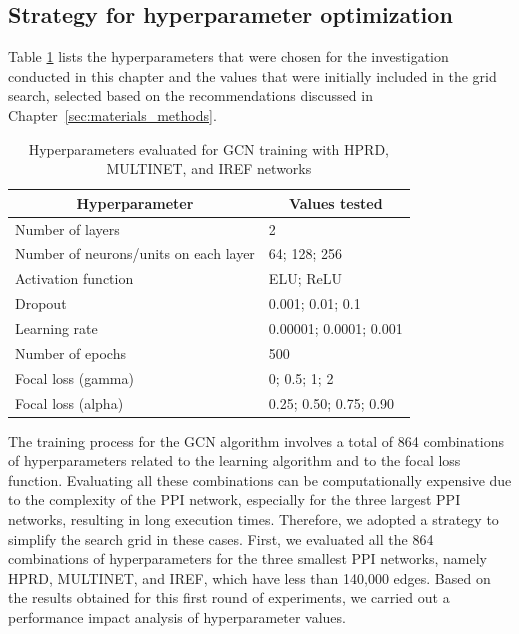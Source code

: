 \subsection{Strategy for hyperparameter optimization}
Table \ref{tab:hyperparameters_range} lists the hyperparameters that were chosen for the investigation conducted in this chapter and the values that were initially included in the grid search, selected based on the recommendations discussed in Chapter~\ref{sec:materials_methods}. 



\begin{table}[!h]
\centering
\caption{Hyperparameters evaluated for GCN training with HPRD, MULTINET, and IREF networks \label{tab:hyperparameters_range}}
\begin{tabular}{ll}
\hline
\multicolumn{1}{c}{Hyperparameter}   & \multicolumn{1}{c}{Values tested} \\ \hline
Number of layers                      & 2                                    \\
Number of neurons/units on each layer & 64; 128; 256                         \\
Activation function                   & ELU; ReLU                            \\
Dropout                               & 0.001; 0.01; 0.1                     \\
Learning rate                         & 0.00001; 0.0001; 0.001               \\
Number of epochs                      & 500                                  \\
Focal loss (gamma)                    & 0; 0.5; 1; 2                         \\
Focal loss (alpha)                    & 0.25; 0.50; 0.75; 0.90               \\ \hline
\end{tabular}
\end{table}

The training process for the GCN algorithm involves a total of 864 combinations of hyperparameters related to the learning algorithm and to the focal loss function. Evaluating all these combinations can be computationally expensive due to the complexity of the PPI network, especially for the three largest PPI networks, resulting in long execution times. Therefore, we adopted a strategy to simplify the search grid in these cases. 
First, we evaluated all the 864 combinations of hyperparameters for the three smallest PPI networks, namely HPRD, MULTINET, and IREF, which have less than 140,000 edges. Based on the results obtained for this first round of experiments, we carried out a performance impact analysis of hyperparameter values. 

